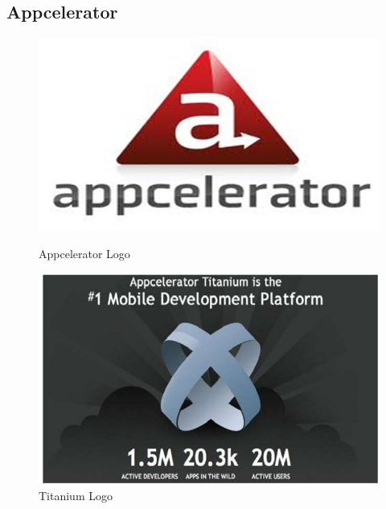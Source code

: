 \documentclass[12pt,a4paper,class,twoside,openany]{report}
\begin{document}
{ \subsection{Appcelerator}
 \begin{figure}
	\begin{minipage}[b]{0.5\linewidth}
	\centering
	\includegraphics[scale=.55]{3-10}
	\caption{Appcelerator Logo}
	\label{fg:3-10}
	\end{minipage}
	\hspace{0.5cm}
	\begin{minipage}[b]{0.5\linewidth}
	\centering
	\includegraphics[width=\textwidth]{3-11}
	\caption{Titanium Logo}
	\label{fg:3-11}
	\end{minipage}
	\end{figure}
}
\end{document}
